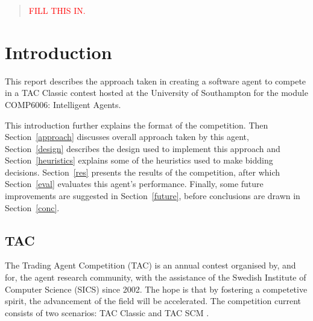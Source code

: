 \documentclass{acm_proc_article-sp}
\begin{document}
\maketitle


\begin{abstract}
 \textcolor{red}{FILL THIS IN.}
\end{abstract}




\section{Introduction}
 \label{intro}

 This report describes the approach taken in creating a software agent to compete in a TAC Classic contest hosted at the University of Southampton for the module COMP6006: Intelligent Agents.
 
 This introduction further explains the format of the competition.  Then Section~\ref{approach} discusses overall approach taken by this agent, Section~\ref{design} describes the design used to implement this approach and Section~\ref{heuristics} explains some of the heuristics used to make bidding decisions.  Section~\ref{res} presents the results of the competition, after which Section~\ref{eval} evaluates this agent's performance.  Finally, some future improvements are suggested in Section~\ref{future}, before conclusions are drawn in Section~\ref{conc}.
 
 \subsection{TAC}
 The Trading Agent Competition (TAC) is an annual contest organised by, and for, the agent research community, with the assistance of the Swedish Institute of Computer Science (SICS) since 2002.  The hope is that by fostering a competetive spirit, the advancement of the field will be accelerated.  The competition current consists of two scenarios: TAC Classic and TAC SCM \cite{SICS2007a}.
 
\end{document}
